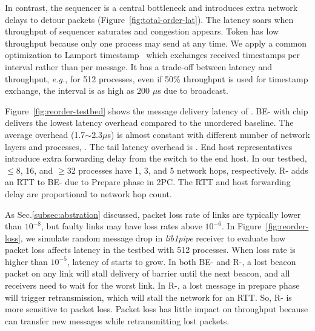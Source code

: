 In contrast, the sequencer is a central bottleneck and introduces extra network delays to detour packets (Figure~\ref{fig:total-order-lat}).
The latency soars when throughput of sequencer saturates and congestion appears.
Token has low throughput because only one process may send at any time.
We apply a common optimization to Lamport timestamp~\cite{lamport1978time} which exchanges received timestamps per interval rather than per message.
It has a trade-off between latency and throughput, \textit{e.g.}, for 512 processes, even if 50\% throughput is used for timestamp exchange, the interval is as high as 200 $\mu$s due to broadcast.





Figure~\ref{fig:reorder-testbed} shows the message delivery latency of \sys{} .
BE-\sys{} with  chip delivers the lowest latency overhead compared to the unordered baseline. The average overhead (1.7$\sim$2.3$\mu$s) is almost constant with different number of network layers and processes, . The tail latency overhead  is .
End host representatives introduce extra forwarding delay from the switch to the end host.
In our testbed, $\le$8, 16, and $\ge$32 processes have 1, 3, and 5 network hops, respectively.
R-\sys{} adds an RTT to BE-\sys{} due to Prepare phase in 2PC.
The RTT and host forwarding delay are proportional to network hop count.

As Sec.\ref{subsec:abstration} discussed, packet loss rate of links are typically lower than $10^{-8}$, but faulty links may have loss rates above $10^{-6}$.
In Figure~\ref{fig:reorder-loss}, we simulate random message drop in \textit{lib1pipe} receiver to evaluate how packet loss affects latency in the testbed with 512 processes.
When loss rate is higher than $10^{-5}$, latency of \sys{} starts to grow. In both BE- and R-\sys{}, a lost beacon packet on any link will stall delivery of barrier until the next beacon, and all receivers need to wait for the worst link. In R-\sys{}, a lost message in prepare phase will trigger retransmission, which will stall the network for an RTT. So, R-\sys{} is more sensitive to packet loss.
Packet loss has little impact on throughput because \sys{} can transfer new messages while retransmitting lost packets.


